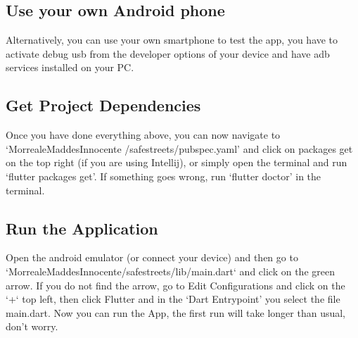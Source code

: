 \documentclass[../RASD.tex]{subfiles}
\begin{document}
\subsection{Use your own Android phone}\label{subsec:use-your-own-android-phone}
    Alternatively, you can use your own smartphone to test the app, you have to activate debug usb from
    the developer options of your device and have adb services installed on your PC.

\subsection{Get Project Dependencies}\label{subsec:get-project-dependencies}
    Once you have done everything above, you can now navigate to `MorrealeMaddesInnocente
    /safestreets/pubspec.yaml'
    and click on packages get on the top right (if you are using Intellij), or simply open the terminal and run
    `flutter packages get'.
    If something goes wrong, run `flutter doctor' in the terminal.
\subsection{Run the Application}\label{subsec:run-the-application}
    Open the android emulator (or connect your device) and then go to
    `MorrealeMaddesInnocente/safestreets/lib/main.dart` and click on the green arrow.
    If you do not find the arrow, go to Edit Configurations and click on the `+` top left,
    then click Flutter and in the `Dart Entrypoint' you select the file main.dart.
    Now you can run the App, the first run will take longer than usual, don't worry.
\end{document}
